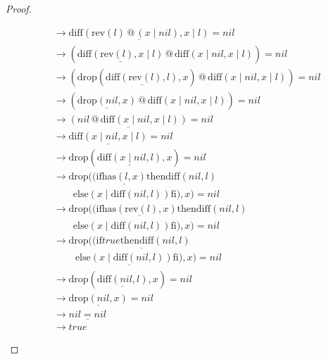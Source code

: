 \documentclass[12pt, a4paper]{article}
\newcommand{\rel}[1]{\mathrel{#1}}
\newcommand{\rmx}[1]{\mathrm{#1}}
\newcommand{\larrow}{\longrightarrow}
\newcommand{\under}{\underline}
\begin{document}
\begin{proof}
\begin{description}
\begin{align*}
	 &\larrow \under{\rmx{diff}(\rmx{rev}(l) \rel{@} (x \mid nil), x \mid l)} = nil \tag{by and} \\
	 &\larrow (\under{\rmx{diff}(\rmx{rev}(l), x \mid l)} \rel{@}  \rmx{diff}(x \mid nil, x \mid l)) = nil \tag{by Problem 9 - Lemma 1} \\
	 &\larrow (\rmx{drop}(\under{\rmx{diff}(\rmx{rev}(l), l)}, x) \rel{@}  \rmx{diff}(x \mid nil, x \mid l)) = nil \tag{by Problem 14} \\
	 &\larrow (\under{\rmx{drop}(nil, x)} \rel{@}  \rmx{diff}(x \mid nil, x \mid l)) = nil \tag{by Problem 16} \\
	 &\larrow \under{(nil \rel{@}  \rmx{diff}(x \mid nil, x \mid l))} = nil \tag{by drop1} \\
	 &\larrow \under{\rmx{diff}(x \mid nil, x \mid l)} = nil \tag{by @1} \\
	 &\larrow \rmx{drop}(\under{\rmx{diff}(x \mid nil, l)}, x) = nil \tag{by Problem 14} \\
	 &\larrow \rmx{drop}((\rel{\rmx{if}} \under{\rmx{has}(l, x)} \rel{\rmx{then}} \rmx{diff}(nil, l) \\
	 &\quad \quad \rel{\rmx{else}} (x \mid \rmx{diff}(nil, l)) \rel{\rmx{fi}}), x) = nil \tag{by diff2} \\
	 &\larrow \rmx{drop}((\rel{\rmx{if}} \under{\rmx{has}(\rmx{rev}(l), x)} \rel{\rmx{then}} \rmx{diff}(nil, l) \\
	 &\quad \quad \rel{\rmx{else}} (x \mid \rmx{diff}(nil, l)) \rel{\rmx{fi}}), x) = nil \tag{by Problem 6} \\
	 &\larrow \rmx{drop}(\under{(\rel{\rmx{if}} true \rel{\rmx{then}} \rmx{diff}(nil, l)} \\
	 &\quad \quad\ \under{\rel{\rmx{else}} (x \mid \rmx{diff}(nil, l)) \rel{\rmx{fi}})}, x) = nil \tag{by case splitting} \\
	 &\larrow \rmx{drop}(\under{\rmx{diff}(nil, l)}, x) = nil \tag{by if1} \\
	 &\larrow \under{\rmx{drop}(nil, x)} = nil \tag{by diff1} \\
	 &\larrow \under{nil = nil} \tag{by drop1} \\
	 &\larrow true \tag{by equality}
\end{align*}


\end{description}
\end{proof}
\end{document}
